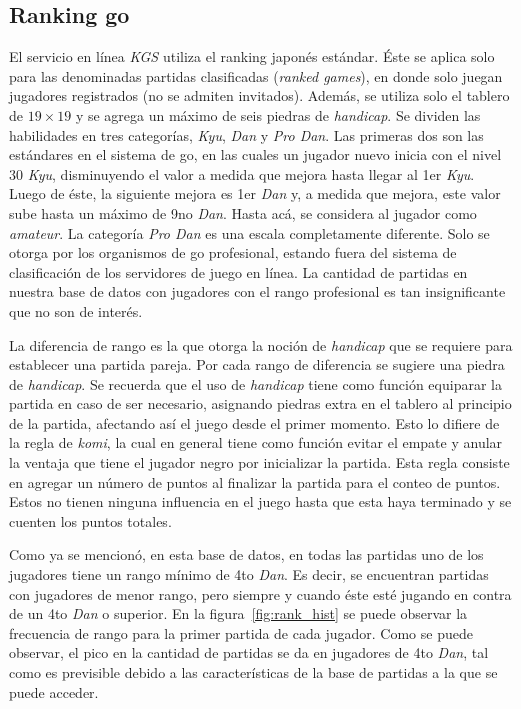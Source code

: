\documentclass[11pt,twoside,spanish]{report} %
\begin{document}
\subsection{Ranking go}

El servicio en l\'inea \textit{KGS} utiliza el ranking japon\'es est\'andar.
\'Este se aplica solo para las denominadas partidas clasificadas (\emph{ranked games}), en donde solo juegan jugadores registrados (no se admiten invitados).
Adem\'as, se utiliza solo el tablero de $19\times19$ y se agrega un m\'aximo de seis piedras de \textit{handicap}.
Se dividen las habilidades en tres categor\'ias, \textit{Kyu}, \textit{Dan} y \textit{Pro Dan}.
Las primeras dos son las est\'andares en el sistema de go, en las cuales un jugador nuevo inicia con el nivel $30$ \textit{Kyu}, disminuyendo el valor a medida que mejora hasta llegar al 1er \textit{Kyu}.
Luego de \'este, la siguiente mejora es 1er \textit{Dan} y, a medida que mejora, este valor sube hasta un m\'aximo de 9no \textit{Dan}.
Hasta ac\'a, se considera al jugador como \textit{amateur}.
La categor\'ia \textit{Pro Dan} es una escala completamente diferente.
Solo se otorga por los organismos de go profesional, estando fuera del sistema de clasificaci\'on de los servidores de juego en l\'inea.
La cantidad de partidas en nuestra base de datos con jugadores con el rango profesional es tan insignificante que no son de inter\'es.


La diferencia de rango es la que otorga la noci\'on de \textit{handicap} que se requiere para establecer una partida pareja.
Por cada rango de diferencia se sugiere una piedra de \textit{handicap}.
Se recuerda que el uso de \textit{handicap} tiene como funci\'on equiparar la partida en caso de ser necesario, asignando piedras extra en el tablero al principio de la partida, afectando as\'i el juego desde el primer momento.
Esto lo difiere de la regla de \textit{komi}, la cual en general tiene como funci\'on evitar el empate y anular la ventaja que tiene el jugador negro por inicializar la partida.
Esta regla consiste en agregar un n\'umero de puntos al finalizar la partida para el conteo de puntos.
Estos no tienen ninguna influencia en el juego hasta que esta haya terminado y se cuenten los puntos totales.

Como ya se mencion\'o, en esta base de datos, en todas las partidas uno de los jugadores tiene un rango m\'inimo de 4to \textit{Dan}.
Es decir, se encuentran partidas con jugadores de menor rango, pero siempre y cuando \'este est\'e jugando en contra de un 4to \textit{Dan} o superior.
En la figura~\ref{fig:rank_hist} se puede observar la frecuencia de rango para la primer partida de cada jugador.
Como se puede observar, el pico en la cantidad de partidas se da en jugadores de 4to \textit{Dan}, tal como es previsible debido a las caracter\'isticas de la base de partidas a la que se puede acceder.
\end{document}
